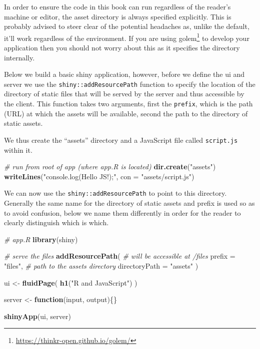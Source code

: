 \documentclass[
]{krantz}
\makeatletter
\newenvironment{Shaded}{\begin{snugshade}}{\end{snugshade}}
\newcommand{\CommentTok}[1]{\textcolor[rgb]{0.37,0.37,0.37}{\textit{#1}}}
\newcommand{\ControlFlowTok}[1]{\textcolor[rgb]{0.27,0.27,0.27}{\textbf{#1}}}
\newcommand{\DataTypeTok}[1]{\textcolor[rgb]{0.27,0.27,0.27}{#1}}
\newcommand{\KeywordTok}[1]{\textcolor[rgb]{0.27,0.27,0.27}{\textbf{#1}}}
\newcommand{\NormalTok}[1]{#1}
\newcommand{\StringTok}[1]{\textcolor[rgb]{0.5,0.5,0.5}{#1}}
\renewcommand{\href}[2]{#2\footnote{\url{#1}}}
\newenvironment{kframe}{%
\medskip{}
\setlength{\fboxsep}{.8em}
 \def\at@end@of@kframe{}%
 \ifinner\ifhmode%
  \def\at@end@of@kframe{\end{minipage}}%
  \begin{minipage}{\columnwidth}%
 \fi\fi%
 \def\FrameCommand##1{\hskip\@totalleftmargin \hskip-\fboxsep
 \colorbox{shadecolor}{##1}\hskip-\fboxsep
     \hskip-\linewidth \hskip-\@totalleftmargin \hskip\columnwidth}%
 \MakeFramed {\advance\hsize-\width
   \@totalleftmargin\z@ \linewidth\hsize
   \@setminipage}}%
 {\par\unskip\endMakeFramed%
 \at@end@of@kframe}
\renewenvironment{Shaded}{\begin{kframe}}{\end{kframe}}
\makeatother
\begin{document}
In order to ensure the code in this book can run regardless of the reader's machine or editor, the asset directory is always specified explicitly. This is probably advised to steer clear of the potential headaches as, unlike the default, it'll work regardless of the environment. If you are using \href{https://thinkr-open.github.io/golem/}{golem} \citep{R-golem} to develop your application then you should not worry about this as it specifies the directory internally.

Below we build a basic shiny application, however, before we define the ui and server we use the \texttt{shiny::addResourcePath} function to specify the location of the directory of static files that will be served by the server and thus accessible by the client. This function takes two arguments, first the \texttt{prefix}, which is the path (URL) at which the assets will be available, second the path to the directory of static assets.

We thus create the ``assets'' directory and a JavaScript file called \texttt{script.js} within it.

\begin{Shaded}
\begin{Highlighting}[]
\CommentTok{\# run from root of app (where app.R is located)}
\KeywordTok{dir.create}\NormalTok{(}\StringTok{"assets"}\NormalTok{)}
\KeywordTok{writeLines}\NormalTok{(}\StringTok{"console.log(\textquotesingle{}Hello JS!\textquotesingle{});"}\NormalTok{, }\DataTypeTok{con =} \StringTok{"assets/script.js"}\NormalTok{)}
\end{Highlighting}
\end{Shaded}

We can now use the \texttt{shiny::addResourcePath} to point to this directory. Generally the same name for the directory of static assets and prefix is used so as to avoid confusion, below we name them differently in order for the reader to clearly distinguish which is which.

\begin{Shaded}
\begin{Highlighting}[]
\CommentTok{\# app.R}
\KeywordTok{library}\NormalTok{(shiny)}

\CommentTok{\# serve the files}
\KeywordTok{addResourcePath}\NormalTok{(}
  \CommentTok{\# will be accessible at /files}
  \DataTypeTok{prefix =} \StringTok{"files"}\NormalTok{, }
  \CommentTok{\# path to the assets directory}
  \DataTypeTok{directoryPath =} \StringTok{"assets"}
\NormalTok{)}

\NormalTok{ui \textless{}{-}}\StringTok{ }\KeywordTok{fluidPage}\NormalTok{(}
  \KeywordTok{h1}\NormalTok{(}\StringTok{"R and JavaScript"}\NormalTok{)}
\NormalTok{)}

\NormalTok{server \textless{}{-}}\StringTok{ }\ControlFlowTok{function}\NormalTok{(input, output)\{\}}

\KeywordTok{shinyApp}\NormalTok{(ui, server)}
\end{Highlighting}
\end{Shaded}
\end{document}
